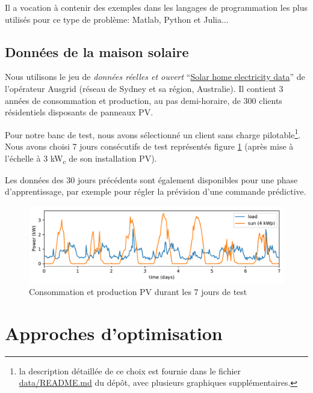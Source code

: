 \documentclass[a4paper,10pt,twocolumn]{article}
\begin{document}
Il a vocation à contenir des exemples dans les langages de programmation les plus utilisés pour ce type de problème:
Matlab, Python et Julia...

\subsection{Données de la maison solaire}

Nous utilisons le jeu de \emph{données réelles et ouvert} ``\href{https://www.ausgrid.com.au/Common/About-us/Corporate-information/Data-to-share/Solar-home-electricity-data.aspx}{Solar home electricity data}'' de l'opérateur Ausgrid (réseau de Sydney et sa région, Australie).
Il contient 3 années de consommation et production, au pas demi-horaire, de 300 clients résidentiels disposants de panneaux PV.

Pour notre banc de test, nous avons sélectionné un client sans charge pilotable\footnote{
  la description détaillée de ce choix est fournie dans le fichier \href{https://github.com/pierre-haessig/solarhome-control-bench/blob/master/data/README.md}{data/README.md} du dépôt, avec plusieurs graphiques supplémentaires.}.
Nous avons choisi 7 jours consécutifs de test représentés figure \ref{fig:testdata} (après mise à l'échelle à 3 kW\textsubscript{c} de son installation PV).

Les données des 30 jours précédents sont également disponibles pour une phase d'apprentissage,
par exemple pour régler la prévision d'une commande prédictive.


\begin{figure}[!ht]
        \begin{center}
                \includegraphics[width=1\columnwidth]{figures/data_week_2011-11-29.pdf}
        \end{center}

        \caption{Consommation et production PV durant les 7 jours de test
        }
        \label{fig:testdata}
\end{figure}


\section{Approches d'optimisation}
\label{s:opt_meth}
\end{document}

